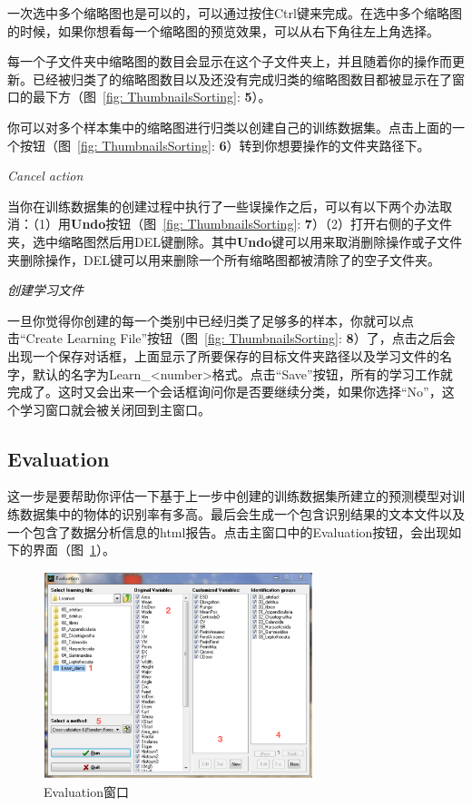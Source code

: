 \documentclass[12pt]{article}
\begin{document}
一次选中多个缩略图也是可以的，可以通过按住Ctrl键来完成。在选中多个缩略图的时候，如果你想看每一个缩略图的预览效果，可以从右下角往左上角选择。

每一个子文件夹中缩略图的数目会显示在这个子文件夹上，并且随着你的操作而更新。已经被归类了的缩略图数目以及还没有完成归类的缩略图数目都被显示在了窗口的最下方（图~\ref{fig: ThumbnailsSorting}: {\color{red}\textbf{5}}）。

你可以对多个样本集中的缩略图进行归类以创建自己的训练数据集。点击上面的一个按钮（图~\ref{fig: ThumbnailsSorting}: {\color{red}\textbf{6}}）转到你想要操作的文件夹路径下。

\textit{Cancel action}

当你在训练数据集的创建过程中执行了一些误操作之后，可以有以下两个办法取消：（1）用\textbf{Undo}按钮（图~\ref{fig: ThumbnailsSorting}: {\color{red}\textbf{7}}）（2）打开右侧的子文件夹，选中缩略图然后用DEL键删除。其中\textbf{Undo}键可以用来取消删除操作或子文件夹删除操作，DEL键可以用来删除一个所有缩略图都被清除了的空子文件夹。

\textit{创建学习文件}

一旦你觉得你创建的每一个类别中已经归类了足够多的样本，你就可以点击“Create Learning File”按钮（图~\ref{fig: ThumbnailsSorting}: {\color{red}\textbf{8}}）了，点击之后会出现一个保存对话框，上面显示了所要保存的目标文件夹路径以及学习文件的名字，默认的名字为Learn\_<number>格式。点击“Save”按钮，所有的学习工作就完成了。这时又会出来一个会话框询问你是否要继续分类，如果你选择“No”，这个学习窗口就会被关闭回到主窗口。

\subsection{Evaluation}

这一步是要帮助你评估一下基于上一步中创建的训练数据集所建立的预测模型对训练数据集中的物体的识别率有多高。最后会生成一个包含识别结果的文本文件以及一个包含了数据分析信息的html报告。点击主窗口中的Evaluation按钮，会出现如下的界面（图~\ref{fig: EvaluationWindow}）。

\begin{figure}[!ht]
\centering
\includegraphics[width=0.7\textwidth]{EvaluationWindow.eps}
\caption{Evaluation窗口}
\label{fig: EvaluationWindow}
\end{figure} 
\end{document}
